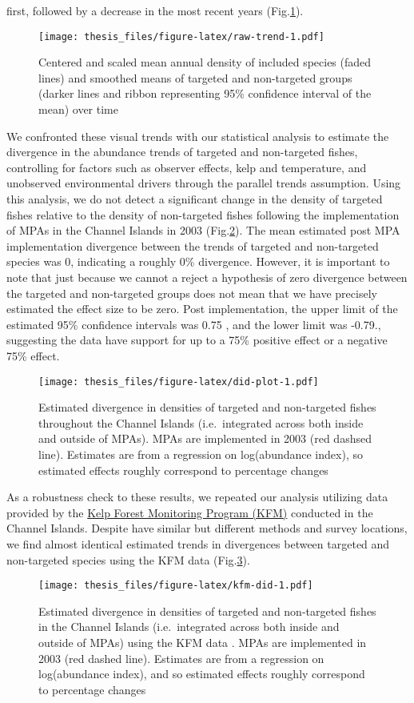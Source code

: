 \documentclass[twoside,12pt,final]{ucthesis-CA2012}
\begin{document}
\begin{ucmainmatter}
first, followed by a decrease in the most recent years
(Fig.\ref{fig:raw-trend}).
\begin{figure}
\centering
\texttt{[image: thesis\_files/figure-latex/raw-trend-1.pdf]}
\caption{\label{fig:raw-trend}Centered and scaled mean annual density of
included species (faded lines) and smoothed means of targeted and
non-targeted groups (darker lines and ribbon representing 95\%
confidence interval of the mean) over time}
\end{figure}
We confronted these visual trends with our statistical analysis to
estimate the divergence in the abundance trends of targeted and
non-targeted fishes, controlling for factors such as observer effects,
kelp and temperature, and unobserved environmental drivers through the
parallel trends assumption. Using this analysis, we do not detect a
significant change in the density of targeted fishes relative to the
density of non-targeted fishes following the implementation of MPAs in
the Channel Islands in 2003 (Fig.\ref{fig:did-plot}). The mean estimated
post MPA implementation divergence between the trends of targeted and
non-targeted species was 0, indicating a roughly 0\% divergence.
However, it is important to note that just because we cannot a reject a
hypothesis of zero divergence between the targeted and non-targeted
groups does not mean that we have precisely estimated the effect size to
be zero. Post implementation, the upper limit of the estimated 95\%
confidence intervals was 0.75 , and the lower limit was -0.79.,
suggesting the data have support for up to a 75\% positive effect or a
negative 75\% effect.
\begin{figure}
\centering
\texttt{[image: thesis\_files/figure-latex/did-plot-1.pdf]}
\caption{\label{fig:did-plot}Estimated divergence in densities of targeted
and non-targeted fishes throughout the Channel Islands (i.e.~integrated
across both inside and outside of MPAs). MPAs are implemented in 2003
(red dashsed line). Estimates are from a regression on log(abundance
index), so estimated effects roughly correspond to percentage changes}
\end{figure}
As a robustness check to these results, we repeated our analysis
utilizing data provided by the
\href{https://science.nature.nps.gov/im/units/medn/monitor/kelpforest.cfm}{Kelp
Forest Monitoring Program (KFM)} conducted in the Channel Islands.
Despite have similar but different methods and survey locations, we find
almost identical estimated trends in divergences between targeted and
non-targeted species using the KFM data (Fig.\ref{fig:kfm-did}).
\begin{figure}
\centering
\texttt{[image: thesis\_files/figure-latex/kfm-did-1.pdf]}
\caption{\label{fig:kfm-did}Estimated divergence in densities of targeted
and non-targeted fishes in the Channel Islands (i.e.~integrated across
both inside and outside of MPAs) using the KFM data . MPAs are
implemented in 2003 (red dashed line). Estimates are from a regression
on log(abundance index), and so estimated effects roughly correspond to
percentage changes}
\end{figure}

\end{ucmainmatter}
\end{document}
